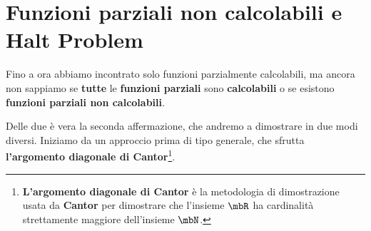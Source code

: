 \section{Funzioni parziali non calcolabili e Halt Problem}

Fino a ora abbiamo incontrato solo funzioni parzialmente calcolabili, ma ancora non sappiamo se \textbf{tutte} le \textbf{funzioni parziali} sono \textbf{calcolabili} o se esistono \textbf{funzioni parziali non calcolabili}.

Delle due è vera la seconda affermazione, che andremo a dimostrare in due modi diversi. Iniziamo da un approccio prima di tipo generale, che sfrutta \textbf{l'argomento diagonale di Cantor}\footnote{\textbf{L'argomento diagonale di Cantor} è la metodologia di dimostrazione usata da \textbf{Cantor} per dimostrare che l'insieme \(\mbR\) ha cardinalità strettamente maggiore dell'insieme \(\mbN\).}.


